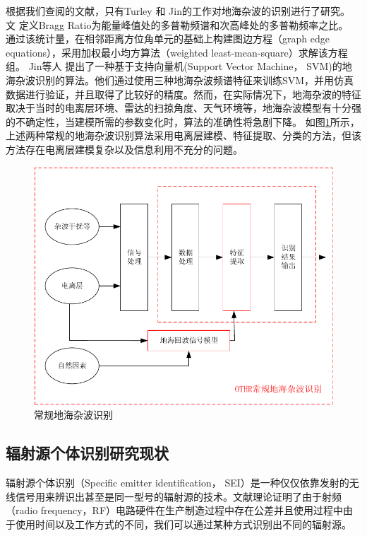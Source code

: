 根据我们查阅的文献，只有Turley\cite{turley2013high} 和 Jin\cite{jin2012svm}的工作对地海杂波的识别进行了研究。
文 \cite{turley2013high}定义Bragg Ratio为能量峰值处的多普勒频谱和次高峰处的多普勒频率之比。
通过该统计量，在相邻距离方位角单元的基础上构建图边方程（graph edge equations），采用加权最小均方算法（weighted least-mean-square）求解该方程组。
Jin等人\cite{jin2012svm} 提出了一种基于支持向量机(Support Vector Machine， SVM)的地海杂波识别的算法。他们通过使用三种地海杂波频谱特征来训练SVM，并用仿真数据进行验证，并且取得了比较好的精度。然而，在实际情况下，地海杂波的特征取决于当时的电离层环境、雷达的扫掠角度、天气环境等，地海杂波模型有十分强的不确定性，当建模所需的参数变化时，算法的准确性将急剧下降。
如图\ref{fig:othr_tradition}所示，上述两种常规的地海杂波识别算法采用电离层建模、特征提取、分类的方法，但该方法存在电离层建模复杂以及信息利用不充分的问题。
\begin{figure}[htb]
	\centering
	\includegraphics[width=\textwidth]{figures/introduction/othr_tradition}
	\caption{常规地海杂波识别}
	\label{fig:othr_tradition}
\end{figure}

\subsection{辐射源个体识别研究现状}
辐射源个体识别（Specific emitter identification， SEI）是一种仅仅依靠发射的无线信号用来辨识出甚至是同一型号的辐射源的技术\cite{Talbot2003Specific}。文献\cite{danev2012physical}理论证明了由于射频（radio frequency，RF）电路硬件在生产制造过程中存在公差并且使用过程中由于使用时间以及工作方式的不同，我们可以通过某种方式识别出不同的辐射源。

